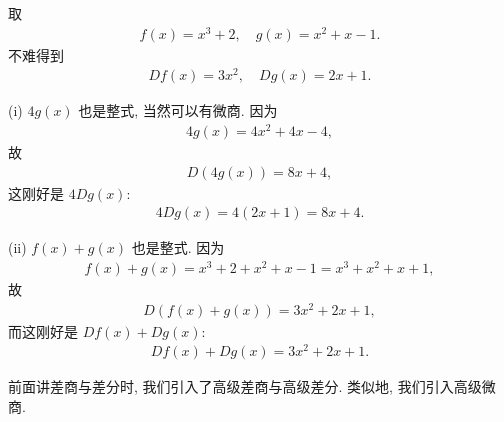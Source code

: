 \begin{example}
    取
    \begin{align*}
        f(x) = x^3 + 2, \quad g(x) = x^2 + x - 1.
    \end{align*}
    不难得到
    \begin{align*}
        Df (x) = 3x^2, \quad Dg (x) = 2x + 1.
    \end{align*}

    (i) $4g(x)$ 也是整式, 当然可以有微商. 因为
    \begin{align*}
        4g(x) = 4x^2 + 4x - 4,
    \end{align*}
    故
    \begin{align*}
        D(4g(x)) = 8x + 4,
    \end{align*}
    这刚好是 $4Dg(x)$:
    \begin{align*}
        4Dg(x) = 4(2x + 1) = 8x + 4.
    \end{align*}

    (ii) $f(x) + g(x)$ 也是整式. 因为
    \begin{align*}
        f(x) + g(x) = x^3 + 2 + x^2 + x - 1 = x^3 + x^2 + x + 1,
    \end{align*}
    故
    \begin{align*}
        D(f(x) + g(x)) = 3x^2 + 2x + 1,
    \end{align*}
    而这刚好是 $Df(x) + Dg(x)$:
    \begin{align*}
        Df(x) + Dg(x) = 3x^2 + 2x + 1.
    \end{align*}
\end{example}

前面讲差商与差分时, 我们引入了高级差商与高级差分. 类似地, 我们引入高级微商.

